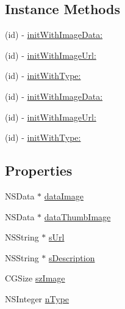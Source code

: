 \subsection*{Instance Methods}
\begin{DoxyCompactItemize}
\item 
(id) -\/ \mbox{\hyperlink{interface_tencent_image_message_obj_v1_a363d7796b5bda745e71b8be57c94ec38}{init\+With\+Image\+Data\+:}}
\item 
(id) -\/ \mbox{\hyperlink{interface_tencent_image_message_obj_v1_aa57af859351b0950d21faf9749a40043}{init\+With\+Image\+Url\+:}}
\item 
(id) -\/ \mbox{\hyperlink{interface_tencent_image_message_obj_v1_a810169339447dcd9cb799d2baa6f6a3e}{init\+With\+Type\+:}}
\item 
(id) -\/ \mbox{\hyperlink{interface_tencent_image_message_obj_v1_a363d7796b5bda745e71b8be57c94ec38}{init\+With\+Image\+Data\+:}}
\item 
(id) -\/ \mbox{\hyperlink{interface_tencent_image_message_obj_v1_aa57af859351b0950d21faf9749a40043}{init\+With\+Image\+Url\+:}}
\item 
(id) -\/ \mbox{\hyperlink{interface_tencent_image_message_obj_v1_a810169339447dcd9cb799d2baa6f6a3e}{init\+With\+Type\+:}}
\end{DoxyCompactItemize}
\subsection*{Properties}
\begin{DoxyCompactItemize}
\item 
N\+S\+Data $\ast$ \mbox{\hyperlink{interface_tencent_image_message_obj_v1_acc140e465b486a8279d4912f8672488a}{data\+Image}}
\item 
N\+S\+Data $\ast$ \mbox{\hyperlink{interface_tencent_image_message_obj_v1_a16cbccb531f1b21a6f34421ee0965263}{data\+Thumb\+Image}}
\item 
N\+S\+String $\ast$ \mbox{\hyperlink{interface_tencent_image_message_obj_v1_a434d0eb69fa2f74621a6cc64c8db5823}{s\+Url}}
\item 
N\+S\+String $\ast$ \mbox{\hyperlink{interface_tencent_image_message_obj_v1_a1fc5be46ebf62b7e537ab16917c69299}{s\+Description}}
\item 
C\+G\+Size \mbox{\hyperlink{interface_tencent_image_message_obj_v1_a409f0af186ceccec8044055ed0ac7a2b}{sz\+Image}}
\item 
N\+S\+Integer \mbox{\hyperlink{interface_tencent_image_message_obj_v1_a6d9b8b56da60df688ec28616e3571441}{n\+Type}}
\end{DoxyCompactItemize}


